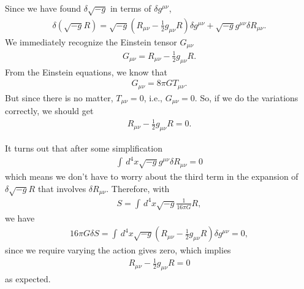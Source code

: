 \documentclass{book}
\numberwithin{equation}{section}
\theoremstyle{definition}
\newcommand{\f}[2]{\frac{#1}{#2}}
\newcommand{\lp}{\left(}
\newcommand{\rp}{\right)}
\begin{document}
Since we have found $\delta \sqrt{-g}$ in terms of $\delta g^{\mu\nu}$, 
\begin{align}
\delta (\sqrt{-g}R ) = \sqrt{-g}\lp R_{\mu\nu} - \f{1}{2}g_{\mu\nu}R \rp\delta g^{\mu\nu} + \sqrt{-g}g^{\mu\nu}\delta R_{\mu\nu}.
\end{align}
We immediately recognize the Einstein tensor $G_{\mu\nu}$ 
\begin{align}
G_{\mu\nu} = R_{\mu\nu} - \f{1}{2}g_{\mu\nu}R.
\end{align}
From the Einstein equations, we know that 
\begin{align}
G_{\mu\nu} = 8\pi G T_{\mu\nu}.
\end{align}
But since there is no matter, $T_{\mu\nu} = 0$, i.e., $G_{\mu\nu} = 0$. So, if we do the variations correctly, we should get
\begin{align}
R_{\mu\nu} - \f{1}{2}g_{\mu\nu}R = 0.
\end{align}

It turns out that after some simplification
\begin{align}\label{R}
\boxed{\int \,d^4x \sqrt{-g}g^{\mu\nu}\delta R_{\mu\nu} = 0}
\end{align}
which means we don't have to worry about the third term in the expansion of $\delta \sqrt{-g}R$ that involves $\delta R_{\mu\nu}$. Therefore, with
\begin{align}
S = \int \,d^4x \sqrt{-g}\f{1}{16\pi G}R,
\end{align}
we have
\begin{align}
16\pi G \delta S = \int\,d^4x \sqrt{-g}\lp R_{\mu\nu} - \f{1}{2}g_{\mu\nu}R \rp\delta g^{\mu\nu} = 0,
\end{align}
since we require varying the action gives zero, which implies 
\begin{align}
\boxed{R_{\mu\nu} - \f{1}{2}g_{\mu\nu}R = 0}
\end{align}
as expected.\\
\end{document}
